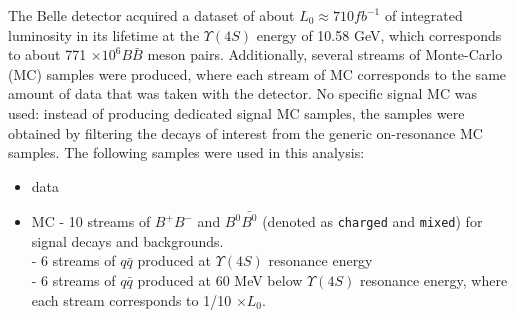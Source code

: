 The Belle detector acquired a dataset of about $L_0 \approx 710 fb^{-1}$ of integrated luminosity in its lifetime at the $\Upsilon(4S)$ energy of 10.58 GeV, which corresponds to about 771 $\times 10^6 B\bar{B}$ meson pairs. Additionally, several streams of Monte-Carlo (MC) samples were produced, where each stream of MC corresponds to the same amount of data that was taken with the detector.
No specific signal MC was used: instead of producing dedicated signal MC samples, the samples were obtained by filtering the decays of interest from the generic on-resonance MC samples.
The following samples were used in this analysis:
\begin{itemize}
    \item data
    \item MC 
    - 10 streams of $B^+B^-$ and $B^0\bar{B^0}$ (denoted as \texttt{charged}
and \texttt{mixed}) for signal decays and backgrounds.\\
    - 6 streams of $q\bar{q}$ produced at $\Upsilon(4S)$ resonance energy \\
    - 6 streams of $q\bar{q}$ produced at 60 MeV below $\Upsilon(4S)$ resonance energy, where each stream corresponds to 1/10 $\times L_0 $.\\
\end{itemize}


